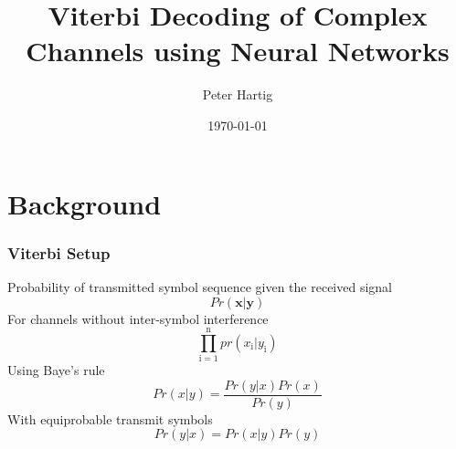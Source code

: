 \documentclass[10pt,tgadventor, onlymath]{beamer}
\title{\large \bfseries Viterbi Decoding of Complex Channels using Neural Networks}
\author{Peter Hartig\\[3ex]
}
\date{\today}
\begin{document}
\frame{
\thispagestyle{empty}
\titlepage
}

\section{Background}

\begin{frame}
\frametitle{Viterbi Setup}
	Probability of transmitted symbol sequence given the received signal
	\begin{equation}
		Pr(\mathbf{x}|\mathbf{y})
	\end{equation}
	For channels without inter-symbol interference
	\begin{equation}
		\prod_{\mathrm{i=1}}^{\mathrm{n}}pr(x_{\mathrm{i}}|y_{\mathrm{i}}) 
	\end{equation}
	Using Baye's rule
	\begin{equation}
		Pr(x|y) = \frac{Pr(y|x) Pr(x)}{Pr(y)}
	\end{equation}
	With equiprobable transmit symbols
	\begin{equation}
		Pr(y|x) = Pr(x|y) Pr(y)
	\end{equation}

\end{frame}
\end{document}

